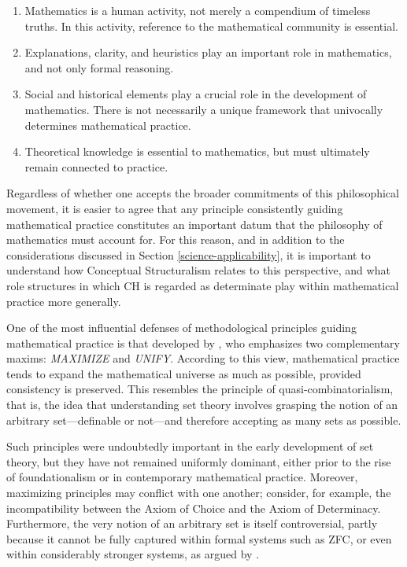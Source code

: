 \documentclass[11pt,a4paper]{article}
\theoremstyle{plain}
\begin{document}
\begin{enumerate}
\item Mathematics is a human activity, not merely a compendium of timeless truths. In this activity, reference to the mathematical community is essential.
\item Explanations, clarity, and heuristics play an important role in mathematics, and not only formal reasoning.
\item Social and historical elements play a crucial role in the development of mathematics. There is not necessarily a unique framework that univocally determines mathematical practice.
\item Theoretical knowledge is essential to mathematics, but must ultimately remain connected to practice.
\end{enumerate}

Regardless of whether one accepts the broader commitments of this philosophical movement, it is easier to agree that any principle consistently guiding mathematical practice constitutes an important datum that the philosophy of mathematics must account for. For this reason, and in addition to the considerations discussed in Section \ref{science-applicability}, it is important to understand how Conceptual Structuralism relates to this perspective, and what role structures in which CH is regarded as determinate play within mathematical practice more generally.

One of the most influential defenses of methodological principles guiding mathematical practice is that developed by \textcite{Maddy1997}, who emphasizes two complementary maxims: \emph{MAXIMIZE} and \emph{UNIFY}. According to this view, mathematical practice tends to expand the mathematical universe as much as possible, provided consistency is preserved. This resembles the principle of quasi-combinatorialism, that is, the idea that understanding set theory involves grasping the notion of an arbitrary set—definable or not—and therefore accepting as many sets as possible.

Such principles were undoubtedly important in the early development of set theory, but they have not remained uniformly dominant, either prior to the rise of foundationalism or in contemporary mathematical practice. Moreover, maximizing principles may conflict with one another; consider, for example, the incompatibility between the Axiom of Choice and the Axiom of Determinacy. Furthermore, the very notion of an arbitrary set is itself controversial, partly because it cannot be fully captured within formal systems such as ZFC, or even within considerably stronger systems, as argued by \textcite{Ferreiros2011}.
\end{document}
